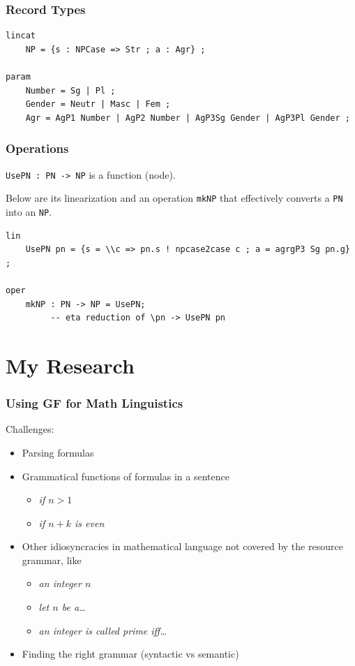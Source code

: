 \documentclass{beamer}
\begin{document}
\begin{frame}[fragile]
    \frametitle{Record Types}
\begin{lstlisting}[language=GF, breaklines=true]
lincat
    NP = {s : NPCase => Str ; a : Agr} ;

param
    Number = Sg | Pl ;
    Gender = Neutr | Masc | Fem ;
    Agr = AgP1 Number | AgP2 Number | AgP3Sg Gender | AgP3Pl Gender ;
\end{lstlisting}
\end{frame}

\begin{frame}[fragile]
    \frametitle{Operations}
    \lstinline[language=GF]{UsePN : PN -> NP} is a function (node).

    Below are its linearization and an operation \lstinline[language=GF]{mkNP} that effectively converts a \lstinline[language=GF]{PN} into an \lstinline[language=GF]{NP}.
\begin{lstlisting}[language=GF, breaklines=true]
lin
    UsePN pn = {s = \\c => pn.s ! npcase2case c ; a = agrgP3 Sg pn.g} ; 

oper
    mkNP : PN -> NP = UsePN;
         -- eta reduction of \pn -> UsePN pn
\end{lstlisting}
\end{frame}

\section{My Research}
\begin{frame}
    \frametitle{Using GF for Math Linguistics}
    Challenges:

    \begin{itemize}
        \item Parsing formulas
        \item Grammatical functions of formulas in a sentence
            \begin{itemize}
                \item \emph{if $n > 1$}
                \item \emph{if $n + k$ is even}
            \end{itemize}
        \item Other idiosyncracies in mathematical language not covered by the resource grammar, like
            \begin{itemize}
                \item \emph{an integer $n$}
                \item \emph{let $n$ be a\ldots}
                \item \emph{an integer is called prime iff\ldots}
            \end{itemize}
        \item Finding the right grammar (syntactic vs semantic)
    \end{itemize}
\end{frame}
\end{document}
